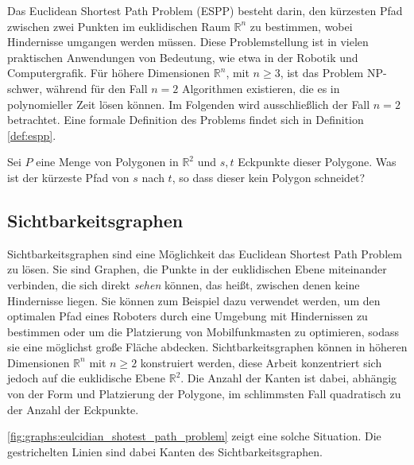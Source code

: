 Das Euclidean Shortest Path Problem (ESPP) besteht darin, den kürzesten Pfad zwischen zwei Punkten im euklidischen Raum $\mathbb{R}^n$ zu bestimmen, wobei Hindernisse umgangen werden müssen.
Diese Problemstellung ist in vielen praktischen Anwendungen von Bedeutung, wie etwa in der Robotik und Computergrafik.
Für höhere Dimensionen $\mathbb{R}^n$, mit $n \geq 3$, ist das Problem NP-schwer, während für den Fall $n = 2$ Algorithmen existieren, die es in polynomieller Zeit lösen können.
Im Folgenden wird ausschließlich der Fall $n = 2$ betrachtet.
Eine formale Definition des Problems findet sich in Definition \ref{def:espp}.

\begin{definition}\label{def:espp}
  Sei $P$ eine Menge von Polygonen in $\mathbb{R}^2$ und $s, t$ Eckpunkte dieser Polygone.
  Was ist der kürzeste Pfad von $s$ nach $t$, so dass dieser kein Polygon schneidet?
\end{definition}

\subsection{Sichtbarkeitsgraphen}

Sichtbarkeitsgraphen sind eine Möglichkeit das Euclidean Shortest Path Problem zu lösen.
Sie sind Graphen, die Punkte in der euklidischen Ebene miteinander verbinden, die sich direkt \emph{sehen} können, das heißt, zwischen denen keine Hindernisse liegen.
Sie können zum Beispiel dazu verwendet werden, um den optimalen Pfad eines Roboters durch eine Umgebung mit Hindernissen zu bestimmen oder um die Platzierung von Mobilfunkmasten zu optimieren, sodass sie eine möglichst große Fläche abdecken.
Sichtbarkeitsgraphen können in höheren Dimensionen $\mathbb{R}^n$ mit $n \geq 2$ konstruiert werden, diese Arbeit konzentriert sich jedoch auf die euklidische Ebene $\mathbb{R}^2$.
Die Anzahl der Kanten ist dabei, abhängig von der Form und Platzierung der Polygone, im schlimmsten Fall quadratisch zu der Anzahl der Eckpunkte.

\autoref{fig:graphs:eulcidian_shotest_path_problem} zeigt eine solche Situation.
Die gestrichelten Linien sind dabei Kanten des Sichtbarkeitsgraphen.

